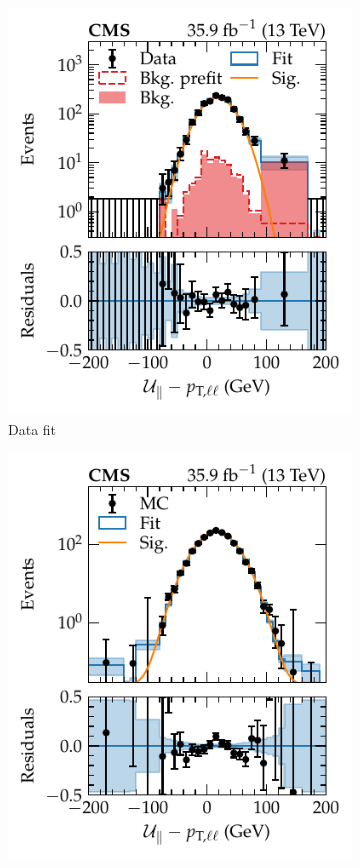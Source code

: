 \begin{figure}[htb]
    \centering
    \begin{subfigure}[b]{0.49\textwidth}
        \centering
        \includegraphics{chapters/041_corrections/images/ptmiss_calib/metres_datafit_example.pdf}
        \caption{Data fit}
        \label{subfiga:metres-fit-examples}
    \end{subfigure}
    \begin{subfigure}[b]{0.49\textwidth}
        \centering
        \includegraphics{chapters/041_corrections/images/ptmiss_calib/metres_mcfit_example.pdf}

\end{subfigure}
\end{figure}
